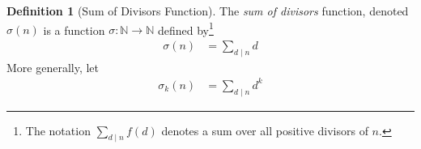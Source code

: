 \documentclass[oneside,12pt]{book}   	%
\newcounter{ex}
\newcounter{def}
\newcounter{pr}
\theoremstyle{definition}
\newtheorem{definition}[thm]{Definition}
\begin{document}
\begin{spacing}{1.618}
		\begin{definition}[Sum of Divisors Function]
			The \emph{sum of divisors} function, denoted $\sigma(n)$ is a function $\sigma:\mathbb{N}\to\mathbb{N}$ defined by\footnote{The notation $\sum_{d\mid n}f(d)$ denotes a sum over all positive divisors of $n$.}
			\begin{alignat}{4}
				\sigma(n)&=\sum_{d\mid n}d
			\end{alignat}
			More generally, let 
			\begin{alignat}{4}
				\sigma_k(n)&=\sum_{d\mid n}d^k
			\end{alignat}
		\end{definition}
		

\end{spacing}
\end{document}
